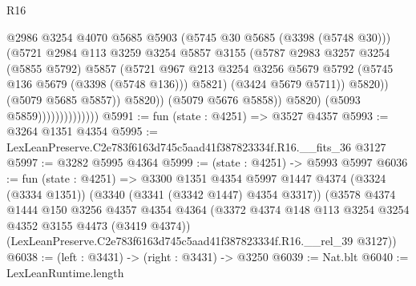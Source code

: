 \begin{lexlean}{R16}
\begin{coremodule}
                                          @2986
                                          @3254
                                          @4070
                                          @5685
                                          @5903
                                          (@5745 @30 @5685 (@3398 (@5748 @30)))
                                          (@5721
                                            @2984
                                            @113
                                            @3259
                                            @3254
                                            @5857
                                            @3155
                                            (@5787
                                              @2983
                                              @3257
                                              @3254
                                              (@5855 @5792)
                                              @5857
                                              (@5721
                                                @967
                                                @213
                                                @3254
                                                @3256
                                                @5679
                                                @5792
                                                (@5745 @136 @5679 (@3398 (@5748 @136)))
                                                @5821)
                                              (@3424 @5679 @5711))
                                            @5820))
                                        (@5079 @5685 @5857))
                                      @5820))
                                  (@5079 @5676 @5858))
                                @5820)
                              (@5093 @5859))))))))))))))
@5991 := fun (state : @4251) => @3527 @4357
@5993 := @3264 @1351 @4354
@5995 := LexLeanPreserve.C2e783f6163d745c5aad41f387823334f.R16.__fits_36 @3127
@5997 := @3282 @5995 @4364
@5999 := (state : @4251) -> @5993 @5997
@6036 := fun (state : @4251) =>
  @3300
    @1351
    @4354
    @5997
    @1447
    @4374
    (@3324 (@3334 @1351))
    (@3340 (@3341 (@3342 @1447) @4354 @3317))
    (@3578
      @4374
      @1444
      @150
      @3256
      @4357
      @4354
      @4364
      (@3372 @4374 @148 @113 @3254 @3254 @4352 @3155 @4473 (@3419 @4374))
      (LexLeanPreserve.C2e783f6163d745c5aad41f387823334f.R16.__rel_39 @3127))
@6038 := (left : @3431) -> (right : @3431) -> @3250
@6039 := Nat.blt
@6040 := LexLeanRuntime.length

\end{coremodule}
\end{lexlean}
